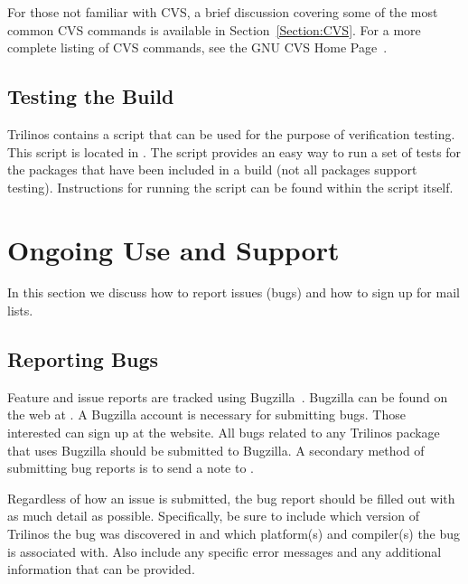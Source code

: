 \documentclass[12pt,relax]{TrilinosUserGuide}
\begin{document}
For those not familiar with CVS, a brief discussion covering some of the most 
common CVS commands is available in Section~\ref{Section:CVS}.  For a more 
complete listing of CVS commands, see the GNU CVS Home Page~\cite{CVS}.




\subsection{Testing the Build}
\label{subsect:TestHarness}

Trilinos contains a script that can be used for the purpose of 
verification testing.  This script is located 
in .  The script 
provides an easy way to run a set of tests for the packages that have been 
included in a build (not all packages support testing).  
Instructions for running the script can be found within the script itself.

\section{Ongoing Use and Support}
\label{Section:UseSupport}
In this section we discuss how to report issues (bugs) and how to sign up
for mail lists.

\subsection{Reporting Bugs}
\label{subsect:Bugzilla}
Feature and issue reports are tracked using Bugzilla~\cite{Bugzilla}.  
Bugzilla can be found on the web at 
.  
A Bugzilla account is necessary for submitting bugs.  Those interested can 
sign up at the website.  All bugs related to any Trilinos package that uses 
Bugzilla should be submitted to Bugzilla.  A secondary method of submitting
bug reports is to send a note 
to .  

Regardless of how an issue is submitted, the bug report should be filled out 
with as much detail as possible.  Specifically, be sure to include which 
version of Trilinos the bug was discovered in and which 
platform(s) and compiler(s) the bug is associated with.  Also include any 
specific error messages and any additional information that can be provided.
\end{document}
